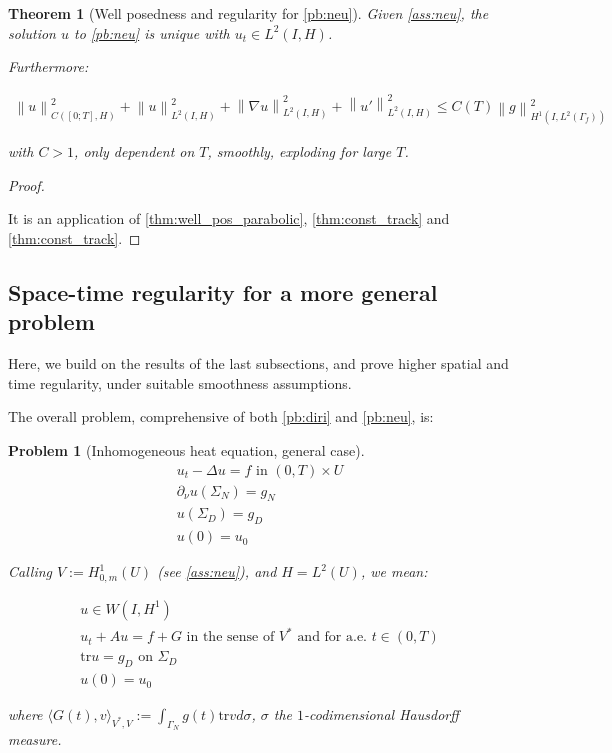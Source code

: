\documentclass[english,a4paper,9pt,oneside]{scrbook}	%
\theoremstyle{break}
\newtheorem{thm}[equation]{Theorem}
\newtheorem{pb}[equation]{Problem}
\newenvironment{mproof}[1][\proofname]{%
  \begin{proof}[#1]$ $\par\nobreak\ignorespaces
}{%
  \end{proof}
}
\renewcommand*{\proofname}{Proof}
\theoremstyle{remark}
\newcommand{\norm}[1]{\left\lVert#1\right\rVert}
\newcommand{\tr}{\text{tr}}
\begin{document}
\begin{appendices}
\begin{thm}[Well posedness and regularity for \cref{pb:neu}]
\label{prop:wp_neu}
Given \cref{ass:neu}, the solution $u$ to \cref{pb:neu} is unique with $u_t \in L^2(I,H)$.

Furthermore: 

\begin{align}
\norm{u}^2_{C([0;T],H)}+\norm{u}_{L^2(I,H)}^2+ \norm{\nabla u}_{L^2(I,H)}^2 + \norm{u'}^2_{L^2(I,H)}\leq C(T)\norm{g}_{H^1(I,L^2(\Gamma_f))}^2
\end{align}

with $C>1$, only dependent on $T$, smoothly, exploding for large $T$.
\end{thm}
\begin{mproof}

It is an application of \cref{thm:well_pos_parabolic}, \cref{thm:const_track} and \cref{thm:const_track}.
\end{mproof}

\subsection{Space-time regularity for a more general problem}

Here, we build on the results of the last subsections, and prove higher spatial and time regularity, under suitable smoothness assumptions.

The overall problem, comprehensive of both \cref{pb:diri} and \cref{pb:neu}, is:

\begin{pb}[Inhomogeneous heat equation, general case]
\label{pb:mix}
\begin{align*}
u_t - \Delta u = f \text{ in } (0,T)\times U\\
\partial_\nu u(\Sigma_N)=g_N\\
u(\Sigma_D)=g_D\\
u(0)=u_0
\end{align*}

Calling $V:=H^1_{0,m}(U)$ (see \cref{ass:neu}), and $H=L^2(U)$, we mean:

\begin{align*}
u \in W(I,H^1) \\
u_t + A u = f + G \text{ in the sense of } V^* \text{ and for a.e. } t \in (0,T) \\
\tr u =g_D \text{ on } \Sigma_D\\
u(0)=u_0
\end{align*}

where $\langle G(t), v \rangle_{V^*,V}:=\int_{\Gamma_N} g(t)\tr v d\sigma$, $\sigma$ the $1$-codimensional Hausdorff measure.


\end{pb}
\end{appendices}
\end{document}
